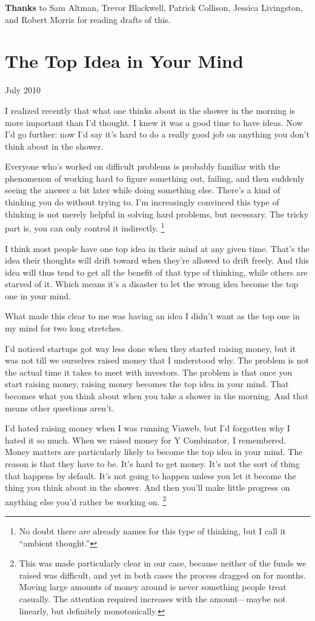 \documentclass[12pt]{book}
\begin{document}
\textbf{Thanks} to Sam Altman, Trevor Blackwell, Patrick Collison,
Jessica Livingston, and Robert Morris for reading drafts of this.
\chapter{The Top Idea in Your Mind }

July 2010

I realized recently that what one thinks about in the shower in the
morning is more important than I'd thought. I knew it was a good time to
have ideas. Now I'd go further: now I'd say it's hard to do a really
good job on anything you don't think about in the shower.

Everyone who's worked on difficult problems is probably familiar with
the phenomenon of working hard to figure something out, failing, and
then suddenly seeing the answer a bit later while doing something else.
There's a kind of thinking you do without trying to. I'm increasingly
convinced this type of thinking is not merely helpful in solving hard
problems, but necessary. The tricky part is, you can only control it
indirectly. \footnote{No doubt there are already names for this type of thinking, but
I call it ``ambient thought.''}

I think most people have one top idea in their mind at any given time.
That's the idea their thoughts will drift toward when they're allowed to
drift freely. And this idea will thus tend to get all the benefit of
that type of thinking, while others are starved of it. Which means it's
a disaster to let the wrong idea become the top one in your mind.

What made this clear to me was having an idea I didn't want as the top
one in my mind for two long stretches.

I'd noticed startups got way less done when they started raising money,
but it was not till we ourselves raised money that I understood why. The
problem is not the actual time it takes to meet with investors. The
problem is that once you start raising money, raising money becomes the
top idea in your mind. That becomes what you think about when you take a
shower in the morning. And that means other questions aren't.

I'd hated raising money when I was running Viaweb, but I'd forgotten why
I hated it so much. When we raised money for Y Combinator, I remembered.
Money matters are particularly likely to become the top idea in your
mind. The reason is that they have to be. It's hard to get money. It's
not the sort of thing that happens by default. It's not going to happen
unless you let it become the thing you think about in the shower. And
then you'll make little progress on anything else you'd rather be
working on. \footnote{This was made particularly clear in our case, because neither of
the funds we raised was difficult, and yet in both cases the process
dragged on for months. Moving large amounts of money around is never
something people treat casually. The attention required increases with
the amount---maybe not linearly, but definitely monotonically.}
\end{document}
